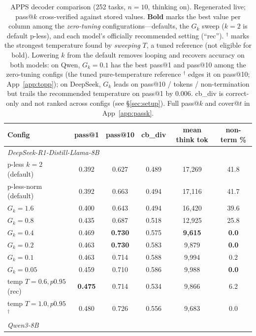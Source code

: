 \documentclass[11pt]{article}                       %
\begin{document}
\begin{table}[t]\centering\small
\caption{APPS decoder comparison (252 tasks, $n{=}10$, thinking on). Regenerated live; pass@$k$
cross-verified against stored values. \textbf{Bold} marks the best value per column among the
\emph{zero-tuning} configurations---defaults, the $G_k$ sweep ($k{=}2$ is default p-less), and each
model's officially recommended setting (``rec''). $^\dagger$ marks the strongest temperature found by
\emph{sweeping} $T$, a tuned reference (not eligible for bold). Lowering $k$ from the default removes
looping and recovers accuracy on both models: on Qwen, $G_k{=}0.1$ has the best pass@1 and pass@10 among
the zero-tuning configs (the tuned pure-temperature reference $^\dagger$ edges it on pass@10; App~\ref{app:topp});
on DeepSeek, $G_k$ leads on pass@10 / tokens / non-termination but trails the recommended temperature on
pass@1 by $0.006$. cb\_div is correct-only
and not ranked across configs (see \S\ref{sec:setup}). Full pass@$k$ and cover@$t$ in App~\ref{app:passk}.}
\label{tab:main}
\begin{tabular}{lccccc}
\toprule
Config & pass@1 & pass@10 & cb\_div & mean think tok & non-term \% \\
\midrule
\multicolumn{6}{l}{\textit{DeepSeek-R1-Distill-Llama-8B}}\\
p-less $k{=}2$ (default) & 0.392 & 0.627 & 0.489 & 17{,}269 & 41.8 \\
p-less-norm (default)    & 0.392 & 0.663 & 0.494 & 17{,}116 & 41.7 \\
$G_k{=}1.6$              & 0.400 & 0.643 & 0.494 & 16{,}420 & 39.6 \\
$G_k{=}0.8$              & 0.435 & 0.687 & 0.518 & 12{,}925 & 25.8 \\
$G_k{=}0.4$              & 0.469 & \textbf{0.730} & 0.575 & \textbf{9{,}615} & \textbf{0.0} \\
$G_k{=}0.2$              & 0.463 & \textbf{0.730} & 0.583 & 9{,}879 & \textbf{0.0} \\
$G_k{=}0.1$              & 0.463 & 0.714 & 0.588 & 9{,}994 & 0.2 \\
$G_k{=}0.05$            & 0.459 & 0.710 & 0.586 & 9{,}988 & \textbf{0.0} \\
temp $T{=}0.6,p0.95$ (rec)    & \textbf{0.475} & 0.714 & 0.534 & 9{,}866 & 6.2 \\
temp $T{=}1.0,p0.95$ $^\dagger$ & 0.480 & 0.726 & 0.556 & 9{,}683 & 0.0 \\
\midrule
\multicolumn{6}{l}{\textit{Qwen3-8B}}\\

\end{tabular}
\end{table}
\end{document}
